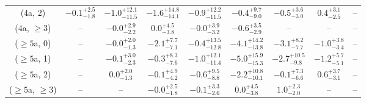\begin{table}[h!]
{\begin{tabular}{ccccccccc}
	(4a, 2) & $-0.1^{+ 2.5 }_{- 1.8 }$ & $-1.0^{+ 12.1 }_{- 11.5 }$ & $-1.6^{+ 14.8 }_{- 14.1 }$ & $-0.9^{+ 12.2 }_{- 11.5 }$ & $-0.4^{+ 9.7 }_{- 9.0 }$ & $-0.5^{+ 3.6 }_{- 3.0 }$ & $0.4^{+ 3.1 }_{- 2.5 }$ & -- \\[0.5ex] 
	(4a, $\ge3$) & -- & $-0.0^{+ 2.9 }_{- 2.2 }$ & $0.0^{+ 4.5 }_{- 3.8 }$ & $-0.0^{+ 3.9 }_{- 3.2 }$ & $-0.6^{+ 3.5 }_{- 2.9 }$ & -- & -- & -- \\[0.5ex] 
	($\ge5$a, 0) & -- & $-0.0^{+ 2.0 }_{- 1.3 }$ & $-2.1^{+ 7.7 }_{- 7.1 }$ & $-0.4^{+ 13.5 }_{- 12.8 }$ & $-4.1^{+ 14.2 }_{- 13.8 }$ & $-3.1^{+ 8.2 }_{- 7.7 }$ & $-1.0^{+ 3.8 }_{- 3.4 }$ & -- \\[0.5ex] 
	($\ge5$a, 1) & -- & $-0.1^{+ 3.0 }_{- 2.3 }$ & $-0.3^{+ 8.3 }_{- 7.6 }$ & $-1.0^{+ 12.1 }_{- 11.4 }$ & $-5.0^{+ 15.9 }_{- 15.3 }$ & $-2.7^{+ 10.5 }_{- 9.8 }$ & $-1.2^{+ 5.7 }_{- 5.1 }$ & -- \\[0.5ex] 
	($\ge5$a, 2) & -- & $0.0^{+ 2.0 }_{- 1.3 }$ & $-0.1^{+ 4.9 }_{- 4.2 }$ & $-0.6^{+ 9.5 }_{- 8.8 }$ & $-2.2^{+ 10.8 }_{- 10.1 }$ & $-0.1^{+ 7.3 }_{- 6.6 }$ & $0.6^{+ 3.7 }_{- 3.1 }$ & -- \\[0.5ex] 
	($\ge5$a, $\ge3$) & -- & -- & $-0.0^{+ 2.5 }_{- 1.8 }$ & $-0.1^{+ 3.3 }_{- 2.6 }$ & $0.0^{+ 4.5 }_{- 3.8 }$ & $1.0^{+ 2.3 }_{- 2.0 }$ & -- & -- \\[0.5ex] 
	\hline
	\hline
\end{tabular}}
\end{table}
